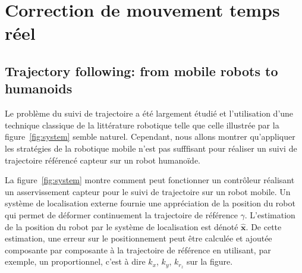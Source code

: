 \section{Correction de mouvement temps réel}
\subsection{Trajectory following: from mobile robots to humanoids}


Le problème du suivi de trajectoire a été largement étudié et
l'utilisation d'une technique classique de la littérature robotique
telle que celle illustrée par la figure~\ref{fig:system} semble
naturel. Cependant, nous allons montrer qu'appliquer les stratégies de
la robotique mobile n'est pas sufffisant pour réaliser un suivi de
trajectoire référencé capteur sur un robot humanoïde.


La figure~\ref{fig:system} montre comment peut fonctionner un
contrôleur réalisant un asservissement capteur pour le suivi de
trajectoire sur un robot mobile. Un système de localisation externe
fournie une appréciation de la position du robot qui permet de
déformer continuement la trajectoire de référence
$\gamma$. L'estimation de la position du robot par le système de
localisation est dénoté $\hat{\mathbf{x}}$. De cette estimation, une
erreur sur le positionnement peut être calculée et ajoutée composante
par composante à la trajectoire de référence en utilisant, par
exemple, un proportionnel, c'est à dire $k_x$, $k_y$, $k_{r_z}$ sur la
figure.


